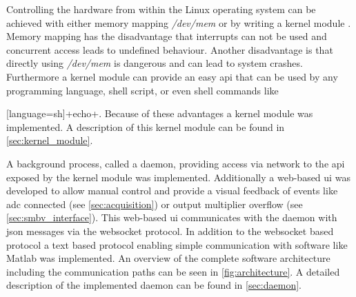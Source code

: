 \documentclass[12pt,a4paper,parskip=full,abstract=true,BCOR=12mm,twoside,open=right]{scrreprt}
\newcommand*{\SavedLstInline}{}
\DeclareRobustCommand*{\lstinline}{%
  \ifmmode
    \let\SavedBGroup\bgroup
    \def\bgroup{%
      \let\bgroup\SavedBGroup
      \hbox\bgroup
    }%
  \fi
  \SavedLstInline
}
\def\device#1{\textit{#1}}
\begin{document}
Controlling the hardware from within the Linux operating system can be
achieved with either memory mapping \mbox{\device{/dev/mem}} or by writing a kernel
module \cite{ldd}. Memory mapping has the disadvantage that interrupts can not
be used and concurrent access leads to undefined behaviour. Another disadvantage
is that directly using \mbox{\device{/dev/mem}} is dangerous and can lead to
system crashes\cite{ldd}. Furthermore a kernel module can provide an easy \gls{api} that
can be used by any programming language, shell script, or even shell commands
like \lstinline[language=sh]+echo+. Because of these advantages a kernel module
was implemented. A description of this kernel module can be found in
\cref{sec:kernel_module}.

A background process, called a daemon, providing access via network to the \gls{api}
exposed by the kernel module was implemented. Additionally a web-based \gls{ui} was developed
to allow manual control and provide a visual feedback of events like \gls{adc} connected (see
\cref{sec:acquisition}) or output multiplier overflow (see \cref{sec:smbv_interface}).
This web-based \gls{ui} communicates with the daemon with \gls{json} messages via
the websocket protocol. In addition to the websocket based protocol a text based protocol enabling
simple communication with software like Matlab was implemented. An overview of the
complete software architecture including the communication paths can be seen in
\cref{fig:architecture}. A detailed description of the implemented daemon can be
found in \cref{sec:daemon}.
\end{document}
